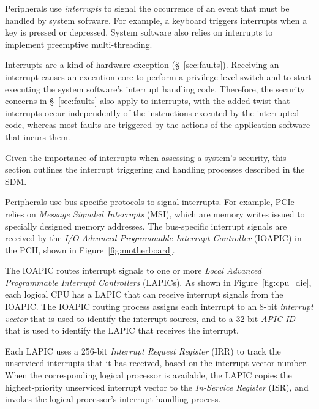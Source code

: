 \label{sec:interrupts}

Peripherals use \textit{interrupts} to signal the occurrence of an event that
must be handled by system software. For example, a keyboard triggers interrupts
when a key is pressed or depressed. System software also relies on interrupts
to implement preemptive multi-threading.

Interrupts are a kind of hardware exception (\S~\ref{sec:faults}). Receiving an
interrupt causes an execution core to perform a privilege level switch and to
start executing the system software's interrupt handling code. Therefore, the
security concerns in \S~\ref{sec:faults} also apply to interrupts, with the
added twist that interrupts occur independently of the instructions executed by
the interrupted code, whereas most faults are triggered by the actions of the
application software that incurs them.

Given the importance of interrupts when assessing a system's security, this
section outlines the interrupt triggering and handling processes described
in the SDM.


Peripherals use bus-specific protocols to signal interrupts. For example, PCIe
relies on \textit{Message Signaled Interrupts} (MSI), which are memory writes
issued to specially designed memory addresses. The bus-specific interrupt
signals are received by the \textit{I/O Advanced Programmable Interrupt
Controller} (IOAPIC) in the PCH, shown in Figure~\ref{fig:motherboard}.


The IOAPIC routes interrupt signals to one or more \textit{Local Advanced
Programmable Interrupt Controllers} (LAPICs). As shown in
Figure~\ref{fig:cpu_die}, each logical CPU has a LAPIC that can receive
interrupt signals from the IOAPIC. The IOAPIC routing process assigns each
interrupt to an 8-bit \textit{interrupt vector} that is used to identify the
interrupt sources, and to a 32-bit \textit{APIC ID} that is used to identify
the LAPIC that receives the interrupt.


Each LAPIC uses a 256-bit \textit{Interrupt Request Register} (IRR) to track
the unserviced interrupts that it has received, based on the interrupt vector
number. When the corresponding logical processor is available, the LAPIC copies
the highest-priority unserviced interrupt vector to the
\textit{In-Service Register} (ISR), and invokes the logical processor's
interrupt handling process.

